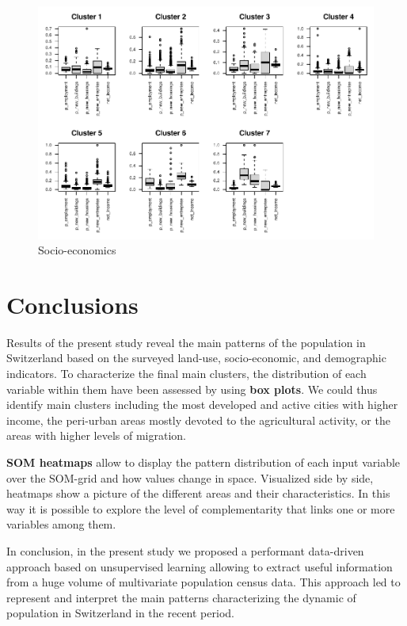 \documentclass[
]{book}
\begin{document}
\begin{figure}
\centering
\includegraphics{05-SOM_files/figure-latex/boxplot-clsM-SocioEconomic-1.pdf}
\caption{\label{fig:boxplot-clsM-SocioEconomic}Socio-economics}
\end{figure}

\hypertarget{conclusions}{%
\section{Conclusions}\label{conclusions}}

Results of the present study reveal the main patterns of the population in Switzerland based on the surveyed land-use, socio-economic, and demographic indicators.
To characterize the final main clusters, the distribution of each variable within them have been assessed by using \textbf{box plots}.
We could thus identify main clusters including the most developed and active cities with higher income, the peri-urban areas mostly devoted to the agricultural activity, or the areas with higher levels of migration.

\textbf{SOM heatmaps} allow to display the pattern distribution of each input variable over the SOM-grid and how values change in space.
Visualized side by side, heatmaps show a picture of the different areas and their characteristics.
In this way it is possible to explore the level of complementarity that links one or more variables among them.

In conclusion, in the present study we proposed a performant data-driven approach based on unsupervised learning allowing to extract useful information from a huge volume of multivariate population census data.
This approach led to represent and interpret the main patterns characterizing the dynamic of population in Switzerland in the recent period.
\end{document}
